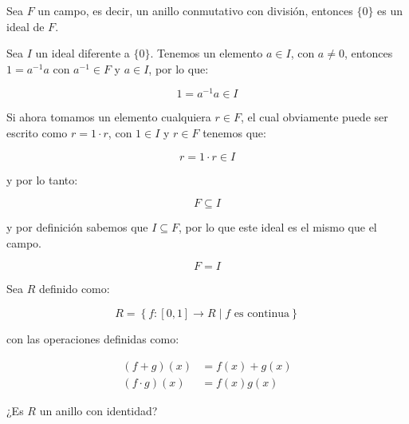         \begin{ejemplo}
            Sea $F$ un campo, es decir, un anillo conmutativo con división, entonces $\{0\}$ es un ideal de $F$.

            Sea $I$ un ideal diferente a $\{0\}$.
            Tenemos un elemento $a \in I$, con $a \ne 0$, entonces $1 = a^{-1} a$ con $a^{-1} \in F$ y $a \in I$, por lo que:

            \begin{equation*}
                1 = a^{-1} a \in I
            \end{equation*}

            Si ahora tomamos un elemento cualquiera $r \in F$, el cual obviamente puede ser escrito como $r = 1 \cdot r$, con $1 \in I$ y $r \in F$ tenemos que:

            \begin{equation*}
                r = 1 \cdot r \in I
            \end{equation*}

            y por lo tanto:

            \begin{equation*}
                F \subseteq I
            \end{equation*}

            y por definición sabemos que $I \subseteq F$, por lo que este ideal es el mismo que el campo.

            \begin{equation*}
                F = I
            \end{equation*}
        \end{ejemplo}

        \begin{ejercicio}
            Sea $R$ definido como:

            \begin{equation*}
                R = \left\{ f \colon [0, 1] \to R \mid f \text{ es continua} \right\}
            \end{equation*}

            con las operaciones definidas como:

            \begin{align*}
                (f + g)(x) &= f(x) + g(x) \\
                (f \cdot g)(x) &= f(x) g(x) 
            \end{align*}

            ¿Es $R$ un anillo con identidad?
        \end{ejercicio}


